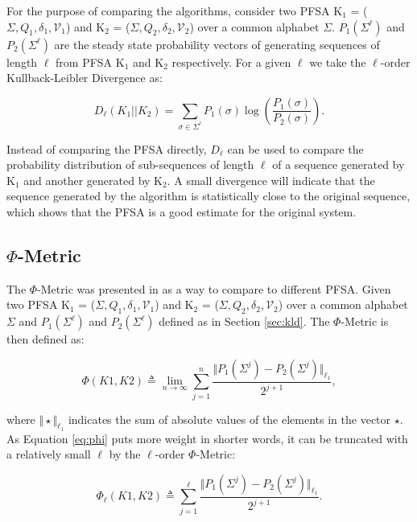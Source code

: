 {For the purpose of comparing the algorithms, consider two PFSA K$_1$ = ($\Sigma, Q_1, \delta_1, \mathcal{V}_1$) and K$_2$ = ($\Sigma, Q_2, \delta_2, \mathcal{V}_2$) over a common alphabet $\Sigma$. $P_1(\Sigma^{\ell})$ and $P_2(\Sigma^{\ell})$ are the steady state probability vectors of generating sequences of length $\ell$ from PFSA K$_1$ and K$_2$ respectively. For a given $\ell$ we take the $\ell$-order Kullback-Leibler Divergence as: 

\begin{equation}
D_{\ell}(K_1||K_2) = \sum_{\sigma\in\Sigma^{\ell}}P_1(\sigma)\log(\frac{P_1(\sigma)}{P_2(\sigma)}).	\label{eq:kldl}
\end{equation}

Instead of comparing the PFSA directly, $D_{\ell}$ can be used to compare the probability distribution of sub-sequences of length $\ell$ of a sequence generated by K$_1$ and another generated by K$_2$. A small divergence will indicate that the sequence generated by the algorithm is statistically close to the original sequence, which shows that the PFSA is a good estimate for the original system.

\subsection{$\Phi$-Metric}

The $\Phi$-Metric was presented in \citep{asok.14} as a way to compare to different PFSA. Given two PFSA K$_1$ = ($\Sigma, Q_1, \delta_1, \mathcal{V}_1$) and K$_2$ = ($\Sigma, Q_2, \delta_2, \mathcal{V}_2$) over a common alphabet $\Sigma$ and  $P_1(\Sigma^{\ell})$ and $P_2(\Sigma^{\ell})$  defined as in Section \ref{sec:kld}. The $\Phi$-Metric is then defined as:

\begin{equation}
\Phi(K1, K2) \triangleq \lim_{n\rightarrow\infty} \sum_{j = 1}^n \frac{\Vert P_1(\Sigma^j)-P_2(\Sigma^j)\Vert_{\ell_1}}{2^{j + 1}},\label{eq:phi}
\end{equation}

\noindent where $\Vert\star\Vert_{\ell_1}$ indicates the sum of absolute values of the elements in the vector $\star$. As Equation \ref{eq:phi} puts more weight in shorter words, it can be truncated with a relatively small $\ell$ by the $\ell$-order $\Phi$-Metric:

\begin{equation}
\Phi_{\ell}(K1, K2) \triangleq \sum_{j = 1}^{\ell} \frac{\Vert P_1(\Sigma^j)-P_2(\Sigma^j)\Vert_{\ell_1}}{2^{j + 1}}.\label{eq:phil}
\end{equation}

}
